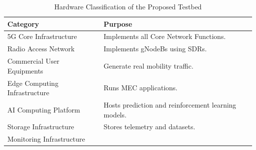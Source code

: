 \documentclass[12pt,a4paper]{article}\usepackage[a4paper,margin=1in]{geometry}\usepackage{graphicx}\usepackage{longtable}\usepackage{booktabs}\usepackage{hyperref}\usepackage{enumitem}\usepackage{amsmath}\usepackage{tikz}\usepackage{pgfgantt}\usepackage{setspace}\setstretch{1.15}\usetikzlibrary{positioning,arrows.meta,shapes.geometric}
\begin{document}
	\begin{table}[h]
		
		\centering
		
		\caption{Hardware Classification of the Proposed Testbed}
		
		\begin{tabular}{p{5cm}p{9cm}}
			
			\toprule
			
			Category
			
			&
			
			Purpose
			
			\\
			
			\midrule
			
			5G Core Infrastructure
			
			&
			
			Implements all Core Network Functions.
			
			\\
			
			Radio Access Network
			
			&
			
			Implements gNodeBs using SDRs.
			
			\\
			
			Commercial User Equipments
			
			&
			
			Generate real mobility traffic.
			
			\\
			
			Edge Computing Infrastructure
			
			&
			
			Runs MEC applications.
			
			\\
			
			AI Computing Platform
			
			&
			
			Hosts prediction and reinforcement learning models.
			
			\\
			
			Storage Infrastructure
			
			&
			
			Stores telemetry and datasets.
			
			\\
			
			Monitoring Infrastructure
			
			&
			

\end{tabular}
\end{table}
\end{document}
